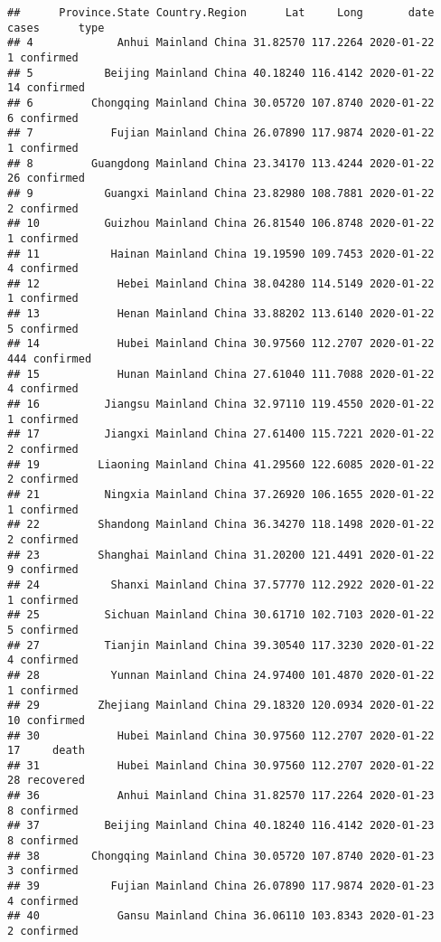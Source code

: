 \documentclass[
]{article}
\begin{document}
\begin{verbatim}
##      Province.State Country.Region      Lat     Long       date cases      type
## 4             Anhui Mainland China 31.82570 117.2264 2020-01-22     1 confirmed
## 5           Beijing Mainland China 40.18240 116.4142 2020-01-22    14 confirmed
## 6         Chongqing Mainland China 30.05720 107.8740 2020-01-22     6 confirmed
## 7            Fujian Mainland China 26.07890 117.9874 2020-01-22     1 confirmed
## 8         Guangdong Mainland China 23.34170 113.4244 2020-01-22    26 confirmed
## 9           Guangxi Mainland China 23.82980 108.7881 2020-01-22     2 confirmed
## 10          Guizhou Mainland China 26.81540 106.8748 2020-01-22     1 confirmed
## 11           Hainan Mainland China 19.19590 109.7453 2020-01-22     4 confirmed
## 12            Hebei Mainland China 38.04280 114.5149 2020-01-22     1 confirmed
## 13            Henan Mainland China 33.88202 113.6140 2020-01-22     5 confirmed
## 14            Hubei Mainland China 30.97560 112.2707 2020-01-22   444 confirmed
## 15            Hunan Mainland China 27.61040 111.7088 2020-01-22     4 confirmed
## 16          Jiangsu Mainland China 32.97110 119.4550 2020-01-22     1 confirmed
## 17          Jiangxi Mainland China 27.61400 115.7221 2020-01-22     2 confirmed
## 19         Liaoning Mainland China 41.29560 122.6085 2020-01-22     2 confirmed
## 21          Ningxia Mainland China 37.26920 106.1655 2020-01-22     1 confirmed
## 22         Shandong Mainland China 36.34270 118.1498 2020-01-22     2 confirmed
## 23         Shanghai Mainland China 31.20200 121.4491 2020-01-22     9 confirmed
## 24           Shanxi Mainland China 37.57770 112.2922 2020-01-22     1 confirmed
## 25          Sichuan Mainland China 30.61710 102.7103 2020-01-22     5 confirmed
## 27          Tianjin Mainland China 39.30540 117.3230 2020-01-22     4 confirmed
## 28           Yunnan Mainland China 24.97400 101.4870 2020-01-22     1 confirmed
## 29         Zhejiang Mainland China 29.18320 120.0934 2020-01-22    10 confirmed
## 30            Hubei Mainland China 30.97560 112.2707 2020-01-22    17     death
## 31            Hubei Mainland China 30.97560 112.2707 2020-01-22    28 recovered
## 36            Anhui Mainland China 31.82570 117.2264 2020-01-23     8 confirmed
## 37          Beijing Mainland China 40.18240 116.4142 2020-01-23     8 confirmed
## 38        Chongqing Mainland China 30.05720 107.8740 2020-01-23     3 confirmed
## 39           Fujian Mainland China 26.07890 117.9874 2020-01-23     4 confirmed
## 40            Gansu Mainland China 36.06110 103.8343 2020-01-23     2 confirmed

\end{verbatim}
\end{document}
